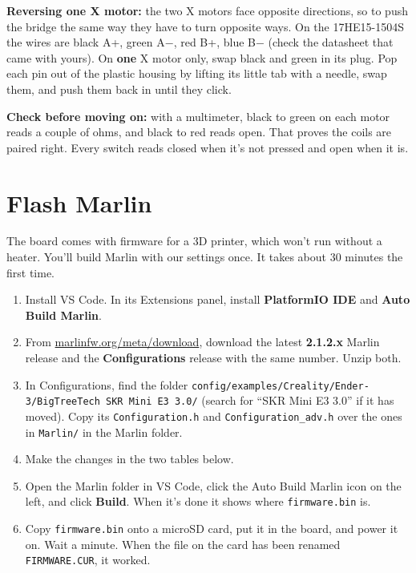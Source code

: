 \documentclass[10pt]{article}
\newcommand{\file}[1]{\texttt{#1}}
\newcommand{\gate}[1]{\par\smallskip\noindent\colorbox{okgreen!10}{\parbox{\dimexpr\linewidth-2\fboxsep}{\textcolor{okgreen}{\textbf{Check before moving on:}} #1}}\par\smallskip}
\begin{document}
\textbf{Reversing one X motor:} the two X motors face opposite directions, so to push the bridge
the same way they have to turn opposite ways. On the 17HE15-1504S the wires are black A+, green
A$-$, red B+, blue B$-$ (check the datasheet that came with yours). On \textbf{one} X motor only, swap
black and green in its plug. Pop each pin out of the plastic housing by lifting its little tab
with a needle, swap them, and push them back in until they click.

\gate{with a multimeter, black to green on each motor reads a couple of ohms, and black to red
reads open. That proves the coils are paired right. Every switch reads closed when it's not pressed
and open when it is.}

\section{Flash Marlin}

The board comes with firmware for a 3D printer, which won't run without a heater. You'll build
Marlin with our settings once. It takes about 30 minutes the first time.

\begin{enumerate}
  \item Install VS Code. In its Extensions panel, install \textbf{PlatformIO IDE} and
        \textbf{Auto Build Marlin}.
  \item From \href{https://marlinfw.org/meta/download/}{marlinfw.org/meta/download}, download the
        latest \textbf{2.1.2.x} Marlin release and the \textbf{Configurations} release with the same
        number. Unzip both.
  \item In Configurations, find the folder \file{config/examples/Creality/Ender-3/BigTreeTech SKR Mini
        E3 3.0/} (search for ``SKR Mini E3 3.0'' if it has moved). Copy its \file{Configuration.h}
        and \file{Configuration\_adv.h} over the ones in \file{Marlin/} in the Marlin folder.
  \item Make the changes in the two tables below.
  \item Open the Marlin folder in VS Code, click the Auto Build Marlin icon on the left, and click
        \textbf{Build}. When it's done it shows where \file{firmware.bin} is.
  \item Copy \file{firmware.bin} onto a microSD card, put it in the board, and power it on.
        Wait a minute. When the file on the card has been renamed \file{FIRMWARE.CUR}, it worked.
\end{enumerate}
\end{document}
